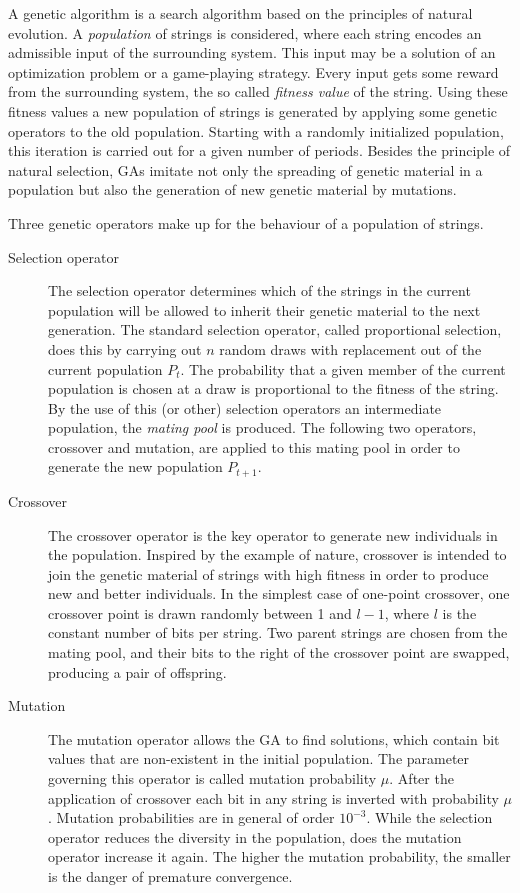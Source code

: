 A genetic algorithm is a search algorithm based on the principles of natural evolution. A \emph{population} of strings is considered, where each string encodes an admissible input of the surrounding system. This input may be a solution of an optimization problem or a game-playing strategy. Every input gets some reward from the surrounding system, the so called \emph{fitness value} of the string. Using these fitness values a new population of strings is generated by applying some genetic operators to the old population. Starting with a randomly initialized population, this iteration is carried out for a given number of periods. Besides the principle of natural selection, GAs imitate not only the spreading of genetic material in a population but also the generation of new genetic material by mutations. 

Three genetic operators make up for the behaviour of a population of strings. 
\begin{description}
\item[Selection operator] The selection operator determines which of the strings in the current population will be allowed to inherit their genetic material to the next generation. The standard selection operator, called proportional selection, does this by carrying out $n$ random draws with replacement out of the current population $P_t$. The probability that a given member of the current population is chosen at a draw is proportional to the fitness of the string. By the use of this (or other) selection operators an intermediate population, the \emph{mating pool} is produced. The following two operators, crossover and mutation, are applied to this mating pool in order to generate the new population $P_{t+1}$.

\item[Crossover] The crossover operator is the key operator to generate new individuals in the population. Inspired by the example of nature, crossover is intended to join the genetic material of strings with high fitness in order to produce new and better individuals. In the simplest case of one-point crossover, one crossover point is drawn randomly between 1 and $l-1$, where $l$ is the constant number of bits per string. Two parent strings are chosen from the mating pool, and their bits to the right of the crossover point are swapped, producing a pair of offspring.

\item[Mutation] The mutation operator allows the GA to find solutions, which contain bit values that are non-existent in the initial population. The parameter governing this operator is called mutation probability $\mu$. After the application of crossover each bit in any string is inverted with probability $\mu$. Mutation probabilities are in general of order $10^{-3}$. While the selection operator reduces the diversity in the population, does the mutation operator increase it again. The higher the mutation probability, the smaller is the danger of premature convergence.
\end{description}

